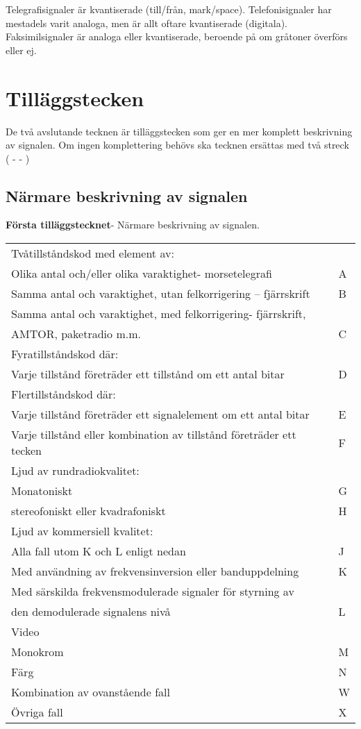 Telegrafisignaler är kvantiserade (till/från, mark/space).
Telefonisignaler har mestadels varit analoga, men är allt oftare
kvantiserade (digitala).
Faksimilsignaler är analoga eller kvantiserade, beroende på om gråtoner
överförs eller ej.


\section{Tilläggstecken}
De två avslutande tecknen är tilläggstecken som ger en mer komplett
beskrivning av signalen.
Om ingen komplettering behövs ska tecknen ersättas med två streck ( - - )

\subsection{Närmare beskrivning av signalen}
\textbf{Första tilläggstecknet}- Närmare beskrivning av signalen.\\
\begin{tabular}{ll}
	Tvåtillståndskod med element av: &\\
	Olika antal och/eller olika varaktighet- morsetelegrafi & A\\
	Samma antal och varaktighet, utan felkorrigering -- fjärrskrift & B\\
	Samma antal och varaktighet, med felkorrigering- fjärrskrift, &\\
	AMTOR, paketradio m.m. & C\\
	Fyratillståndskod där: &\\
	Varje tillstånd företräder ett tillstånd om ett antal bitar & D\\
	Flertillståndskod där: &\\
	Varje tillstånd företräder ett signalelement om ett antal bitar & E\\
	Varje tillstånd eller kombination av tillstånd företräder ett tecken & F\\
	Ljud av rundradiokvalitet: & \\
	Monatoniskt & G\\
	stereofoniskt eller kvadrafoniskt & H\\
	Ljud av kommersiell kvalitet: &\\
	Alla fall utom K och L enligt nedan & J\\
	Med användning av frekvensinversion eller banduppdelning & K\\
	Med särskilda frekvensmodulerade signaler för styrning av &\\
	den demodulerade signalens nivå & L\\
	Video &\\
	Monokrom & M\\
	Färg & N\\
	Kombination av ovanstående fall & W\\
	Övriga fall & X\\
\end{tabular}

